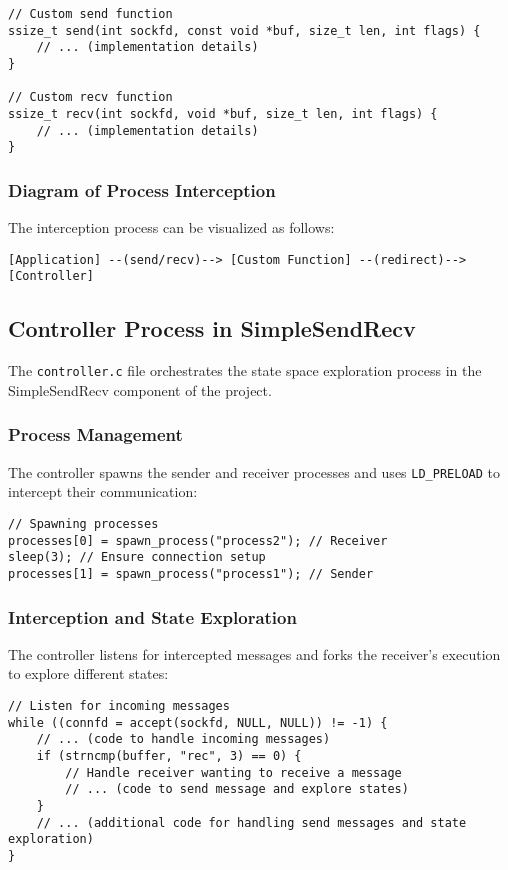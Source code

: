 \documentclass[a4paper,11pt,oneside]{report}
\begin{document}
\begin{verbatim}
// Custom send function
ssize_t send(int sockfd, const void *buf, size_t len, int flags) {
    // ... (implementation details)
}

// Custom recv function
ssize_t recv(int sockfd, void *buf, size_t len, int flags) {
    // ... (implementation details)
}
\end{verbatim}

\subsubsection{Diagram of Process Interception}
The interception process can be visualized as follows:
\begin{verbatim}
[Application] --(send/recv)--> [Custom Function] --(redirect)--> [Controller]
\end{verbatim}

\subsection{Controller Process in SimpleSendRecv}
The \texttt{controller.c} file orchestrates the state space exploration process in the SimpleSendRecv component of the project.

\subsubsection{Process Management}
The controller spawns the sender and receiver processes and uses \texttt{LD\_PRELOAD} to intercept their communication:

\begin{verbatim}
// Spawning processes
processes[0] = spawn_process("process2"); // Receiver
sleep(3); // Ensure connection setup
processes[1] = spawn_process("process1"); // Sender
\end{verbatim}

\subsubsection{Interception and State Exploration}
The controller listens for intercepted messages and forks the receiver's execution to explore different states:

\begin{verbatim}
// Listen for incoming messages
while ((connfd = accept(sockfd, NULL, NULL)) != -1) {
    // ... (code to handle incoming messages)
    if (strncmp(buffer, "rec", 3) == 0) {
        // Handle receiver wanting to receive a message
        // ... (code to send message and explore states)
    }
    // ... (additional code for handling send messages and state exploration)
}
\end{verbatim}
\end{document}
